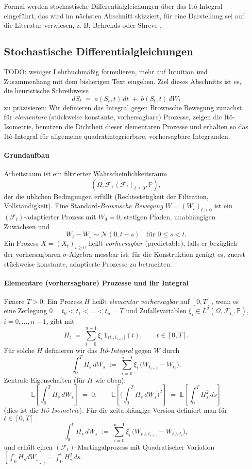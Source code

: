 Formal werden stochastische Differentialgleichungen über das It\^o-Integral eingeführt, das wird 
im nächsten Abschnitt skizziert, für eine Darstellung sei auf die Literatur verwiesen, z. B. Behrends \cite{behrends} oder Shreve \cite{shreve}.

\subsection{Stochastische Differentialgleichungen}
TODO: weniger Lehrbuchmäßig formulieren, mehr auf Intuition und Zusammenhang mit dem bisherigen Text eingehen.
Ziel dieses Abschnitts ist es, die heuristische Schreibweise
$$
dS_t \;=\; a(S_t,t)\,dt \;+\; b(S_t,t)\,dW_t
$$
zu präzisieren: Wir definieren das Integral gegen Brownsche Bewegung zunächst für \emph{elementare} (stückweise konstante, vorhersagbare) Prozesse, zeigen die It\^o-Isometrie, benutzen die Dichtheit dieser elementaren Prozesse und erhalten so das It\^o-Integral für allgemeine quadratintegrierbare, vorhersagbare Integranden.

\paragraph{Grundaufbau}
Arbeitsraum ist ein filtrierter Wahrscheinlichkeitsraum
$$
(\Omega,\mathcal F,(\mathcal F_t)_{t\ge 0},\mathbb P),
$$
der die üblichen Bedingungen erfüllt (Rechtsstetigkeit der Filtration, Vollständigkeit). Eine Standard-\emph{Brownsche Bewegung} $W=(W_t)_{t\ge 0}$ ist ein $(\mathcal F_t)$-adaptierter Prozess mit $W_0=0$, stetigen Pfaden, unabhängigen Zuwächsen und
$$
W_t - W_s \sim \mathcal N(0,t-s)\quad\text{für }0\le s<t.
$$
Ein Prozess $X=(X_t)_{t\ge 0}$ heißt \emph{vorhersagbar} (predictable), falls er bezüglich der vorhersagbaren $\sigma$-Algebra messbar ist; für die Konstruktion genügt es, zuerst stückweise konstante, adaptierte Prozesse zu betrachten.

\paragraph{Elementare (vorhersagbare) Prozesse und ihr Integral}
Fixiere $T>0$. Ein Prozess $H$ heißt \emph{elementar vorhersagbar} auf $[0,T]$, wenn es eine Zerlegung $0=t_0<t_1<\dots<t_n=T$ und Zufallsvariablen $\xi_i\in L^2(\Omega,\mathcal F_{t_i},\mathbb P)$, $i=0,\dots,n-1$, gibt mit
$$
H_t \;=\; \sum_{i=0}^{n-1} \xi_i\,\mathbf 1_{(t_i,t_{i+1}]}(t),\qquad t\in[0,T].
$$
Für solche $H$ definieren wir das \emph{It\^o-Integral} gegen $W$ durch
$$
\int_0^T H_s\,dW_s \;:=\; \sum_{i=0}^{n-1} \xi_i\,\big(W_{t_{i+1}}-W_{t_i}\big).
$$
Zentrale Eigenschaften (für $H$ wie oben):
$$
\mathbb E\!\left[\int_0^T H_s\,dW_s\right] \;=\; 0,\qquad
\mathbb E\!\left[\Big(\int_0^T H_s\,dW_s\Big)^{\!2}\right] \;=\; \mathbb E\!\left[\int_0^T H_s^2\,ds\right]
$$
(dies ist die \emph{It\^o-Isometrie}). Für die zeitabhängige Version definiert man für $t\in[0,T]$
$$
\int_0^t H_s\,dW_s \;:=\; \sum_{i=0}^{n-1} \xi_i\,\big(W_{t\wedge t_{i+1}}-W_{t\wedge t_i}\big),
$$
und erhält einen $(\mathcal F_t)$-Martingalprozess mit Quadratischer Variation
$[\!\int_0^\cdot H_s dW_s]_t = \int_0^t H_s^2\,ds$.

